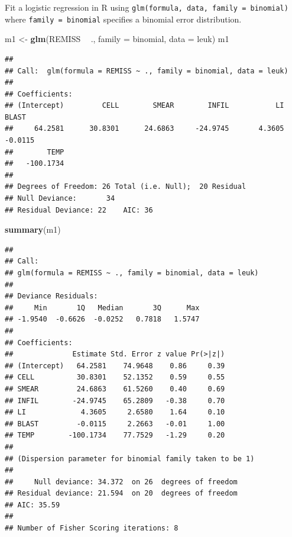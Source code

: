 \documentclass[
]{book}
\newenvironment{Shaded}{\begin{snugshade}}{\end{snugshade}}
\newcommand{\DataTypeTok}[1]{\textcolor[rgb]{0.13,0.29,0.53}{#1}}
\newcommand{\KeywordTok}[1]{\textcolor[rgb]{0.13,0.29,0.53}{\textbf{#1}}}
\newcommand{\NormalTok}[1]{#1}
\newcommand{\OperatorTok}[1]{\textcolor[rgb]{0.81,0.36,0.00}{\textbf{#1}}}
\newcommand{\StringTok}[1]{\textcolor[rgb]{0.31,0.60,0.02}{#1}}
\begin{document}
Fit a logistic regression in R using \texttt{glm(formula,\ data,\ family\ =\ binomial)} where \texttt{family\ =\ binomial} specifies a binomial error distribution.

\begin{Shaded}
\begin{Highlighting}[]
\NormalTok{m1 <-}\StringTok{ }\KeywordTok{glm}\NormalTok{(REMISS }\OperatorTok{~}\StringTok{ }\NormalTok{., }\DataTypeTok{family =}\NormalTok{ binomial, }\DataTypeTok{data =}\NormalTok{ leuk)}
\NormalTok{m1}
\end{Highlighting}
\end{Shaded}

\begin{verbatim}
## 
## Call:  glm(formula = REMISS ~ ., family = binomial, data = leuk)
## 
## Coefficients:
## (Intercept)         CELL        SMEAR        INFIL           LI        BLAST  
##     64.2581      30.8301      24.6863     -24.9745       4.3605      -0.0115  
##        TEMP  
##   -100.1734  
## 
## Degrees of Freedom: 26 Total (i.e. Null);  20 Residual
## Null Deviance:       34 
## Residual Deviance: 22    AIC: 36
\end{verbatim}

\begin{Shaded}
\begin{Highlighting}[]
\KeywordTok{summary}\NormalTok{(m1)}
\end{Highlighting}
\end{Shaded}

\begin{verbatim}
## 
## Call:
## glm(formula = REMISS ~ ., family = binomial, data = leuk)
## 
## Deviance Residuals: 
##     Min       1Q   Median       3Q      Max  
## -1.9540  -0.6626  -0.0252   0.7818   1.5747  
## 
## Coefficients:
##              Estimate Std. Error z value Pr(>|z|)
## (Intercept)   64.2581    74.9648    0.86     0.39
## CELL          30.8301    52.1352    0.59     0.55
## SMEAR         24.6863    61.5260    0.40     0.69
## INFIL        -24.9745    65.2809   -0.38     0.70
## LI             4.3605     2.6580    1.64     0.10
## BLAST         -0.0115     2.2663   -0.01     1.00
## TEMP        -100.1734    77.7529   -1.29     0.20
## 
## (Dispersion parameter for binomial family taken to be 1)
## 
##     Null deviance: 34.372  on 26  degrees of freedom
## Residual deviance: 21.594  on 20  degrees of freedom
## AIC: 35.59
## 
## Number of Fisher Scoring iterations: 8
\end{verbatim}
\end{document}
